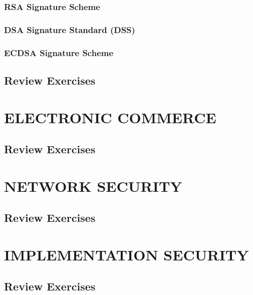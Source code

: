 \documentclass[a4paper, 10 pt, conference]{ieeeconf}
\begin{document}
\vspace{0.5cm}
\subsubsection{\textbf{RSA Signature Scheme}}



\vspace{0.5cm}
\subsubsection{\textbf{DSA Signature Standard (DSS)}}



\vspace{0.5cm}
\subsubsection{\textbf{ECDSA Signature Scheme}}


\subsection{\textbf{Review Exercises}}






\section{\textbf{ELECTRONIC COMMERCE}}
\subsection{\textbf{Review Exercises}}






\section{\textbf{NETWORK SECURITY}}
\subsection{\textbf{Review Exercises}}






\section{\textbf{IMPLEMENTATION SECURITY}}
\subsection{\textbf{Review Exercises}}
\end{document}
